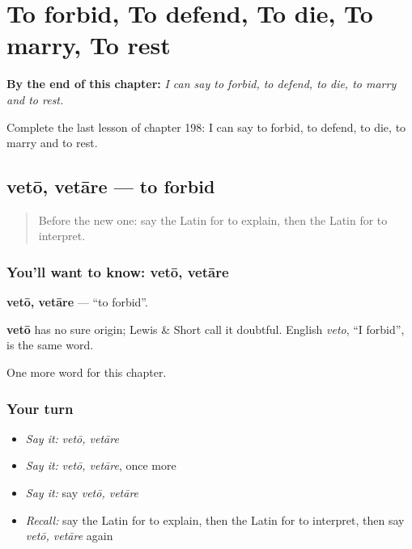 
\chapter{To forbid, To defend, To die, To marry, To rest}
\label{ch:la-to-forbid-to-defend-to-die-to-marry-to-rest}

\begin{chapteropening}
\textbf{By the end of this chapter:} \emph{I can say to forbid, to defend, to die, to marry and to rest.}

Complete the last lesson of chapter 198: I can say to forbid, to defend, to die, to marry and to rest.
\end{chapteropening}

\section[vetō, vetāre]{vetō, vetāre — to forbid}

\label{lesson:LA-C198-veto}



\begin{quote}
Before the new one: say the Latin for to explain, then the Latin for to interpret.
\end{quote}

\subsection*{You'll want to know: vetō, vetāre}
\textbf{vetō, vetāre} — \textquotedblleft{}to forbid\textquotedblright{}.

\begin{cousinweb}
\textbf{vetō} has no sure origin; Lewis \& Short call it doubtful. English \emph{veto}, \textquotedblleft{}I forbid\textquotedblright{}, is the same word.
\end{cousinweb}

\begin{grammarlens}[title={What you've built}]
One more word for this chapter.
\end{grammarlens}

\subsection*{Your turn}
\begin{itemize}
\raggedright
  \item \emph{Say it:} \emph{vetō, vetāre}
  \item \emph{Say it:} \emph{vetō, vetāre}, once more
  \item \emph{Say it:} say \emph{vetō, vetāre}
  \item \emph{Recall:} say the Latin for to explain, then the Latin for to interpret, then say \emph{vetō, vetāre} again
\end{itemize}

